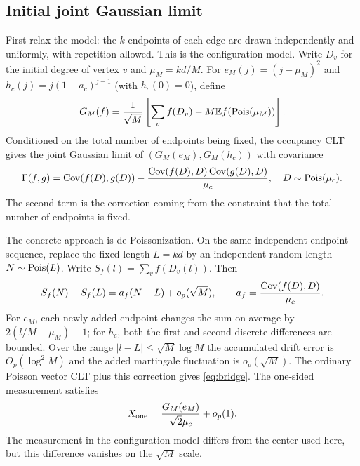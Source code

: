 \subsection{Initial joint Gaussian limit}\label{sec:mp-init}
First relax the model: the $k$ endpoints of each edge are drawn independently and uniformly, with repetition
allowed. This is the configuration model. Write $D_v$ for the initial degree of vertex $v$ and
$\mu_M=kd/M$. For $e_M(j)=(j-\mu_M)^2$ and $h_c(j)=j(1-a_c)^{j-1}$ (with $h_c(0)=0$), define
\begin{equation*}
G_M(f)=\frac1{\sqrt M}\left[\sum_v f(D_v)-M\mathbb E f(\operatorname{Pois}(\mu_M))\right].
\end{equation*}
Conditioned on the total number of endpoints being fixed, the occupancy CLT gives the joint Gaussian limit of
$(G_M(e_M),G_M(h_c))$ with covariance
\begin{equation}
\Gamma(f,g)=\operatorname{Cov}(f(D),g(D))-
\frac{\operatorname{Cov}(f(D),D)\operatorname{Cov}(g(D),D)}{\mu_c},\quad D\sim\operatorname{Pois}(\mu_c).\label{eq:bridge}
\end{equation}
The second term is the correction coming from the constraint that the total number of endpoints is fixed.

The concrete approach is de-Poissonization. On the same independent endpoint sequence, replace the fixed
length $L=kd$ by an independent random length $N\sim\operatorname{Pois}(L)$. Write $S_f(l)=\sum_v f(D_v(l))$. Then
\begin{equation*}
S_f(N)-S_f(L)=a_f(N-L)+o_p(\sqrt M),\qquad
a_f=\frac{\operatorname{Cov}(f(D),D)}{\mu_c}.
\end{equation*}
For $e_M$, each newly added endpoint changes the sum on average by $2(l/M-\mu_M)+1$; for $h_c$, both the
first and second discrete differences are bounded. Over the range $|l-L|\le\sqrt M\log M$ the accumulated
drift error is $O_p(\log^2M)$ and the added martingale fluctuation is $o_p(\sqrt M)$. The ordinary Poisson
vector CLT plus this correction gives \eqref{eq:bridge}. The one-sided measurement satisfies
\begin{equation*}
X_{\rm one}=\frac{G_M(e_M)}{\sqrt2\mu_c}+o_p(1).
\end{equation*}
The measurement in the configuration model differs from the center used here, but this difference vanishes on
the $\sqrt M$ scale.

